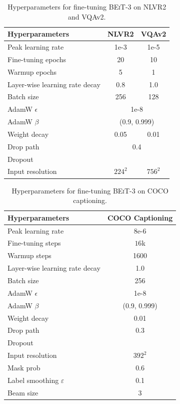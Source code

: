\documentclass{article}
\newcommand{\xmark}{{\color{black}\ding{55}}}%
\newcommand\our{\textsc{BEiT-3}}
\begin{document}
\begin{table}[H]
\centering
\small
\begin{tabular}{l|cc}
\toprule
\bf Hyperparameters & \bf NLVR2 & \bf VQAv2 \\
\midrule
Peak learning rate & 1e-3 & 1e-5 \\
Fine-tuning epochs & 20  & 10 \\
Warmup epochs & 5 & 1 \\
Layer-wise learning rate decay & 0.8 & 1.0 \\
Batch size & 256 & 128 \\
AdamW $\epsilon$ & \multicolumn{2}{c}{1e-8}  \\
AdamW $\beta$ & \multicolumn{2}{c}{(0.9, 0.999)} \\
Weight decay & 0.05 & 0.01 \\
Drop path & \multicolumn{2}{c}{0.4} \\
Dropout & \multicolumn{2}{c}{\xmark} \\
Input resolution & $224^2$ & $756^2$ \\
\bottomrule
\end{tabular}
\vspace{2mm}
\caption{
Hyperparameters for fine-tuning \our{} on NLVR2 and VQAv2.
}
\label{tbl:ft:vqa_nlvr2:hyperparams}
\end{table}


\begin{table}[H]
\centering
\small
\begin{tabular}{l|c}
\toprule
\bf Hyperparameters & \bf COCO Captioning \\
\midrule
Peak learning rate & 8e-6 \\
Fine-tuning steps & $16$k \\
Warmup steps & 1600 \\
Layer-wise learning rate decay & 1.0 \\
Batch size & 256 \\
AdamW $\epsilon$ & 1e-8  \\
AdamW $\beta$ & (0.9, 0.999) \\
Weight decay & 0.01 \\
Drop path & 0.3 \\
Dropout & \xmark \\
Input resolution & $392^2$ \\
Mask prob & 0.6 \\
Label smoothing $\varepsilon$ & 0.1 \\
Beam size & 3 \\
\bottomrule
\end{tabular}
\vspace{2mm}
\caption{
Hyperparameters for fine-tuning \our{} on COCO captioning.
}
\label{tbl:ft:captioning:hyperparams}
\end{table}
\end{document}
